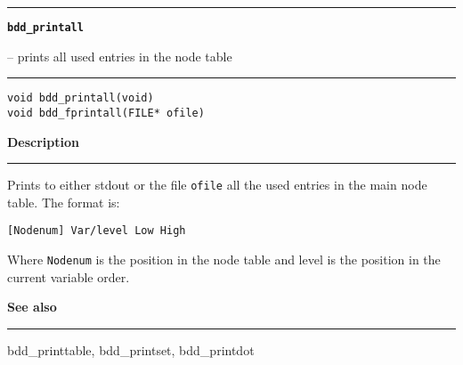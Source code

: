 \begin{minipage}{\textwidth}

\noindent\begin{minipage}{\textwidth}
\rule{\textwidth}{0.5mm}
{\tt\bf bdd\_printall }
\--- prints all used entries in the node table  \hspace{\fill}
\\\rule[1.5ex]{\textwidth}{0.5mm}
\end{minipage}

\noindent\begin{verbatim}
void bdd_printall(void)
void bdd_fprintall(FILE* ofile) 
\end{verbatim}

\vspace{\parsep}\noindent
{\bf Description}\\\rule[1.5ex]{\textwidth}{0.2mm}\vspace{-1.5ex}\setlength{\parindent}{1em}
Prints to either stdout or the file {\tt ofile} all the used
           entries in the main node table. The format is:
	   \begin{Ill}
  	     {\tt [Nodenum] Var/level Low High}
	   \end{Ill}
	   Where {\tt Nodenum} is the position in the node table and level
	   is the position in the current variable order. 

\vspace{\parsep}\vspace{\baselineskip}\noindent
{\bf See also}\\\rule[1.5ex]{\textwidth}{0.2mm}\vspace{-1.5ex}
bdd\_printtable, bdd\_printset, bdd\_printdot 
\end{minipage}
\vspace{8ex}
